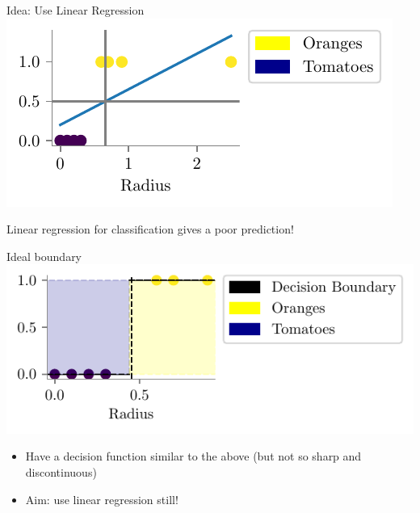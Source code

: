 \documentclass{beamer}
\begin{document}
\begin{frame}{Idea: Use Linear Regression}
\includegraphics{../assets/logistic-regression/figures/linear-orange-tomatoes-decision-modified.pdf}


Linear regression for classification gives a poor prediction!
\end{frame}

\begin{frame}{Ideal boundary}
\includegraphics{../assets/logistic-regression/figures/linear-orange-tomatoes-decision-ideal.pdf}

\begin{itemize}[<+->]
	\item Have a decision function similar to the above (but not so sharp and discontinuous)
	\item Aim: use linear regression still!
\end{itemize}
\end{frame}
\end{document}
